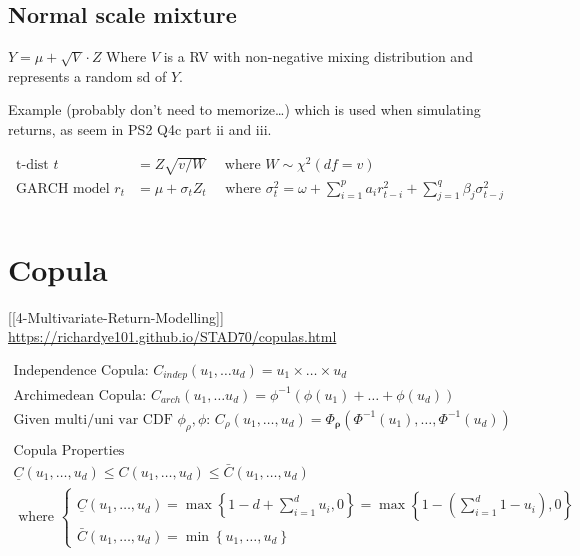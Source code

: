 \documentclass[
  oneside]{book}
\begin{document}
\hypertarget{normal-scale-mixture-1}{%
\subsection{Normal scale mixture}\label{normal-scale-mixture-1}}

\(Y = \mu+\sqrt{ V } \cdot Z\)
Where \(V\) is a RV with non-negative mixing distribution and represents a random sd of \(Y\).

Example (probably don't need to memorize\ldots) which is used when simulating returns, as seem in PS2 Q4c part ii and iii.

\[
\begin{aligned}
\text{t-dist } t &= Z\sqrt{ v/W } \quad \text{ where } W \sim \chi^{2}(df=v)\\
\text{GARCH model } r_{t} &= \mu + \sigma_{t}Z_{t} \quad \text{ where } \sigma^{2}_{t} = \omega + \sum^{p}_{i=1}a_{i}r^{2}_{t-i}+\sum^{q}_{j=1}\beta_{j}\sigma^{2}_{t-j}\\
\end{aligned}
\]

\hypertarget{copula}{%
\section{Copula}\label{copula}}

{[}{[}4-Multivariate-Return-Modelling{]}{]}
\url{https://richardye101.github.io/STAD70/copulas.html}

\[
\begin{gathered}
\text{Independence Copula: } C_{indep} (u_{1}, \dots u_{d}) = u_{1} \times \dots \times u_{d}\\
\text{Archimedean Copula: } C_{arch}(u_{1}, \dots u_{d}) = \phi ^{-1}(\phi(u_{1})+\dots+\phi(u_{d}))\\
\text{Given multi/uni var CDF $\phi_{\rho}, \phi$: } C_{\rho}(u_{1},\dots ,u_{d}) = \Phi_{\boldsymbol{\rho}}(\Phi ^{-1}(u_{1}), \dots, \Phi ^{-1}(u_{d}))\\ 
\\
\text{Copula Properties} \\
\underline{C}\left(u_1, \ldots, u_d\right) \leq C\left(u_1, \ldots, u_d\right) \leq \bar{C}\left(u_1, \ldots, u_d\right) \\
\text { where }
\begin{cases}
\underline{C}\left(u_1, \ldots, u_d\right)=\max \left\{1-d+\sum_{i=1}^d u_i, 0\right\} = \max\left\{ 1 - \left(\sum^d_{i=1} 1 - u_{i}\right),0 \right\} \\
\bar{C}\left(u_1, \ldots, u_d\right)=\min \left\{u_1, \ldots, u_d\right\}
\end{cases}
\end{gathered}
\]
\end{document}
